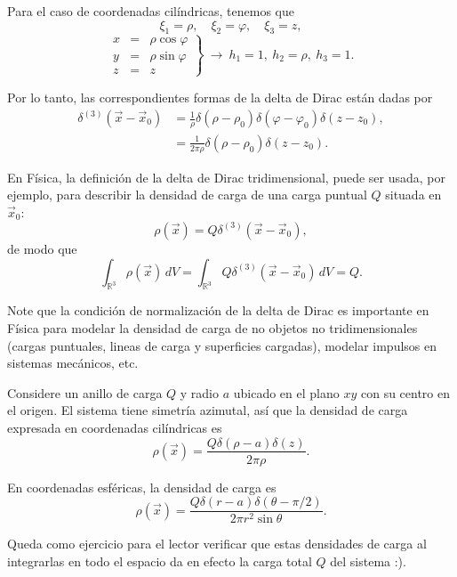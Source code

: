 \begin{ejemplo}
Para el caso de coordenadas cilíndricas, tenemos que 
\begin{equation}
 \xi_1 = \rho, \quad \xi_2 = \varphi, \quad \xi_3 = z,   
\end{equation}
\begin{equation*}
   \left. \begin{array}{cll}
         x &=& \rho \cos \varphi \\
    y &=& \rho \sin \varphi \\
    z&=& z  
    \end{array} \right\}  ~\longrightarrow~ h_1 = 1, ~ h_2 = \rho, ~ h_3 = 1.
\end{equation*}

Por lo tanto, las correspondientes formas de la delta de Dirac están dadas por
\begin{align}
   \delta^{(3)}(\Vec{x} - \Vec{x}_0) &= \frac{1}{\rho} \delta(\rho - \rho_0)\delta(\varphi - \varphi_0) \delta(z - z_0), \\
   &= \frac{1}{2\pi \rho} \delta(\rho - \rho_0)\delta(z-z_0).
\end{align}

\end{ejemplo}

En Física, la definición de la delta de Dirac tridimensional, puede ser usada, por ejemplo, para describir la densidad de carga de una carga puntual $Q$ situada en $\vec{x}_0$:
\begin{equation}
\rho(\vec{x}) = Q \delta^{(3)}(\vec{x} - \vec{x}_0),    
\end{equation}
de modo que 
\begin{equation}
 \int_{\mathbb{R}^3} \rho(\vec{x}) \,dV = \int_{\mathbb{R}^3} Q \delta^{(3)}(\Vec{x} - \Vec{x}_0) \,dV = Q.   
\end{equation}

Note que la condición de normalización de la delta de Dirac es importante en Física para modelar la densidad de carga de no objetos no tridimensionales (cargas puntuales, lineas de carga y superficies cargadas), modelar impulsos en sistemas mecánicos, etc. 

\begin{ejemplo}
    Considere un anillo de carga $Q$ y radio $a$ ubicado en el plano $xy$ con su centro en el origen. El sistema tiene simetría azimutal, así que la densidad de carga expresada en coordenadas cilíndricas es
    \begin{equation}
        \rho(\vec{x}) = \frac{Q\delta(\rho -a) \delta(z)}{2\pi\rho}.
    \end{equation}

    En coordenadas esféricas, la densidad de carga es
    \begin{equation}
        \rho(\vec{x}) = \frac{Q\delta(r -a) \delta(\theta - \pi/2)}{2\pi r^2\sin\theta}.
    \end{equation}

    Queda como ejercicio para el lector verificar que estas densidades de carga al integrarlas en todo el espacio da en efecto la carga total $Q$ del sistema :).
\end{ejemplo}

